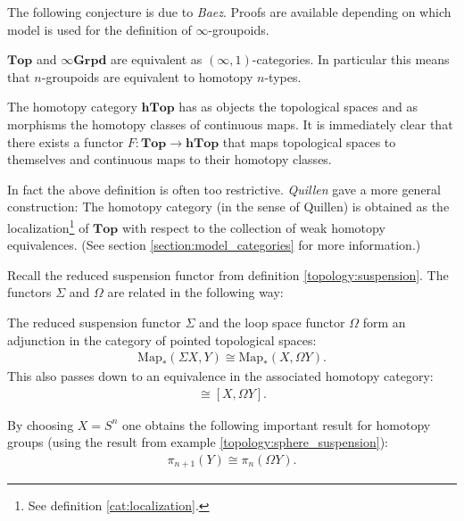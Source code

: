     The following conjecture is due to \textit{Baez}. Proofs are available depending on which model is used for the definition of $\infty$-groupoids.
    \begin{theorem}
        $\mathbf{Top}$ and $\mathbf{\infty Grpd}$ are equivalent as $(\infty, 1)$-categories. In particular this means that $n$-groupoids are equivalent to homotopy $n$-types.
    \end{theorem}

    \begin{property}
        The homotopy category $\mathbf{hTop}$ has as objects the topological spaces and as morphisms the homotopy classes of continuous maps. It is immediately clear that there exists a functor $F:\mathbf{Top}\rightarrow\mathbf{hTop}$ that maps topological spaces to themselves and continuous maps to their homotopy classes.

        In fact the above definition is often too restrictive. \textit{Quillen} gave a more general construction: The homotopy category (in the sense of Quillen) is obtained as the localization\footnote{See definition \ref{cat:localization}.} of $\mathbf{Top}$ with respect to the collection of weak homotopy equivalences. (See section \ref{section:model_categories} for more information.)
    \end{property}

    Recall the reduced suspension functor from definition \ref{topology:suspension}. The functors $\Sigma$ and $\Omega$ are related in the following way:
    \begin{property}\label{topology:eckmann_hilton}
        The reduced suspension functor $\Sigma$ and the loop space functor $\Omega$ form an adjunction in the category of pointed topological spaces:
        \begin{gather}
            \text{Map}_*(\Sigma X, Y)\cong\text{Map}_*(X, \Omega Y).
        \end{gather}
        This also passes down to an equivalence in the associated homotopy category:
        \begin{gather}
            [\Sigma X, Y]\cong[X, \Omega Y].
        \end{gather}
    \end{property}
    \begin{result}
        By choosing $X=S^n$ one obtains the following important result for homotopy groups (using the result from example \ref{topology:sphere_suspension}):
        \begin{gather}
            \pi_{n+1}(Y)\cong\pi_n(\Omega Y).
        \end{gather}
    \end{result}

